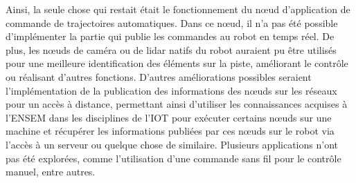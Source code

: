 Ainsi, la seule chose qui restait était le fonctionnement du nœud d'application de commande de trajectoires automatiques. Dans ce nœud, il n'a pas été possible d'implémenter la partie qui publie les commandes au robot en temps réel. De plus, les nœuds de caméra ou de lidar natifs du robot auraient pu être utilisés pour une meilleure identification des éléments sur la piste, améliorant le contrôle ou réalisant d'autres fonctions. D'autres améliorations possibles seraient l'implémentation de la publication des informations des nœuds sur les réseaux pour un accès à distance, permettant ainsi d'utiliser les connaissances acquises à l'ENSEM dans les disciplines de l'IOT pour exécuter certains nœuds sur une machine et récupérer les informations publiées par ces nœuds sur le robot via l'accès à un serveur ou quelque chose de similaire. Plusieurs applications n'ont pas été explorées, comme l'utilisation d'une commande sans fil pour le contrôle manuel, entre autres.

